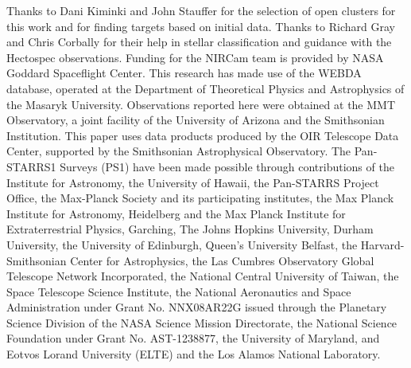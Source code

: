 \documentclass{aastex6}
\begin{document}
Thanks to Dani Kiminki and John Stauffer for the selection of open clusters for this work and for finding targets based on initial data.
Thanks to Richard Gray and Chris Corbally for their help in stellar classification and guidance with the Hectospec observations.
Funding for the NIRCam team is provided by NASA Goddard Spaceflight Center. This research has made use of the WEBDA database, operated at the Department of Theoretical Physics and Astrophysics of the Masaryk University.
Observations reported here were obtained at the MMT Observatory, a joint facility of the University of Arizona and the Smithsonian Institution.
This paper uses data products produced by the OIR Telescope Data Center, supported by the Smithsonian Astrophysical Observatory.
The Pan-STARRS1 Surveys (PS1) have been made possible through contributions of the Institute for Astronomy, the University of Hawaii, the Pan-STARRS Project Office, the Max-Planck Society and its participating institutes, the Max Planck Institute for Astronomy, Heidelberg and the Max Planck Institute for Extraterrestrial Physics, Garching, The Johns Hopkins University, Durham University, the University of Edinburgh, Queen's University Belfast, the Harvard-Smithsonian Center for Astrophysics, the Las Cumbres Observatory Global Telescope Network Incorporated, the National Central University of Taiwan, the Space Telescope Science Institute, the National Aeronautics and Space Administration under Grant No. NNX08AR22G issued through the Planetary Science Division of the NASA Science Mission Directorate, the National Science Foundation under Grant No. AST-1238877, the University of Maryland, and Eotvos Lorand University (ELTE) and the Los Alamos National Laboratory. 


\end{document}
